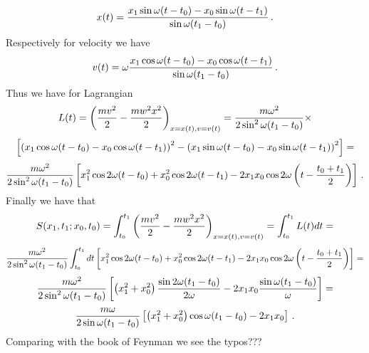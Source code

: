        $$
x(t)={
   x_1\sin {\omega} (t-t_0)
       - 
  x_0\sin {\omega} (t-t_1)
    \over
        \sin {\omega} (t_1-t_0)
       }\,.
       $$
Respectively for velocity  we have
    $$
v(t)={\omega}{
   x_1\cos {\omega} (t-t_0)
       - 
  x_0\cos {\omega} (t-t_1)
    \over
        \sin {\omega} (t_1-t_0)
       }\,.
       $$
Thus we have  for Lagrangian
      $$
L(t)=
  \left(
 {m v^2\over 2}-{mw^2x^2\over 2}
    \right)_{x=x(t),v=v(t)}=
     {m{\omega}^2\over 2\sin^2{\omega}(t_1-t_0)}
      \times
      $$
          $$
       \left[
     \left(
        x_1\cos {\omega} (t-t_0)
       -
        x_0\cos {\omega} (t-t_1)
       \right)^2
          -
      \left(
        x_1\sin {\omega} (t-t_0)
       -
        x_0\sin {\omega} (t-t_1)
       \right)^2
      \right]
       =
       $$
$$
     {m{\omega}^2\over 2\sin^2{\omega}(t_1-t_0)}
       \left[
    x_1^2\cos 2{\omega} (t-t_0)
    +
    x_0^2\cos 2{\omega} (t-t_1)
         -2x_1x_0
       \cos
       2{\omega}
      \left(
       t-{t_0+t_1\over 2}
        \right)
       \right]\,.
$$
Finally we have
that
       $$
    S(x_1,t_1;x_0,t_0)=
       \int_{t_0}^{t_1}
   \left(
 {m v^2\over 2}-{mw^2x^2\over 2}
    \right)_{x=x(t),v=v(t)}         
       =\int_{t_0}^{t_1}L(t)dt=
       $$
 $$
     {m{\omega}^2\over 2\sin^2{\omega}(t_1-t_0)}
        \int_{t_0}^{t_1}
       dt
       \left[
    x_1^2\cos 2{\omega} (t-t_0)
    +
    x_0^2\cos 2{\omega} (t-t_1)
         -2x_1x_0
       \cos
       2{\omega}
      \left(
       t-{t_0+t_1\over 2}
        \right)
       \right]=
$$  
   $$ 
     {m{\omega}^2\over 2\sin^2{\omega}(t_1-t_0)}
       \left[
    \left(x_1^2+x_0^2\right)
      {\sin 2{\omega} (t_1-t_0)\over 2{\omega}}
    -           
         2x_1x_0
      {\sin {\omega} (t_1-t_0)\over {\omega}}
       \right]=
     $$
         $$ 
     {m{\omega}\over 2\sin{\omega}(t_1-t_0)}
       \left[
    \left(x_1^2+x_0^2\right)
      \cos {\omega} (t_1-t_0)
                -           
         2x_1x_0
       \right]\,.
     $$
Comparing with the book of Feynman we see the typos???
\bye
